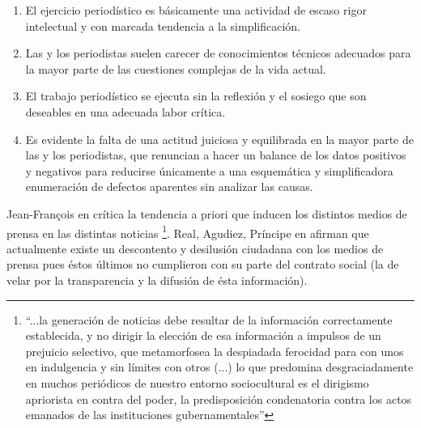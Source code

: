 \begin{enumerate}
\item El ejercicio periodístico es básicamente una actividad de escaso rigor intelectual y con marcada tendencia a la simplificación. 
\item Las y los periodistas suelen carecer de conocimientos técnicos adecuados para la mayor parte de las cuestiones complejas de la vida actual.
\item El trabajo periodístico se ejecuta sin la reflexión y el sosiego que son deseables en una adecuada labor crítica. 
\item Es evidente la falta de una actitud juiciosa y equilibrada en la mayor parte de las y los periodistas, que renuncian a hacer un balance de los datos positivos y negativos para reducirse únicamente a una esquemática y simplificadora enumeración de defectos aparentes sin analizar las causas.
\end{enumerate}

Jean-François en \cite{revel1990conocimiento} crítica la tendencia a priori que inducen los distintos medios de prensa en las distintas noticias \footnote{``...la generación de noticias debe resultar de la información correctamente establecida, y no dirigir la elección de esa información a impulsos de un prejuicio selectivo, que metamorfosea la despiadada ferocidad para con unos en indulgencia y sin límites con otros (...) lo que predomina desgraciadamente en muchos periódicos de nuestro entorno sociocultural es el dirigismo apriorista en contra del poder, la predisposición condenatoria contra los actos emanados de las instituciones gubernamentales''}. Real, Agudiez, Príncipe en \cite{ESMPESMP0707110189A} afirman que actualmente existe un descontento y desilusión ciudadana con los medios de prensa pues éstos últimos no cumplieron con su parte del contrato social (la de velar por la transparencia y la difusión de ésta información). 


